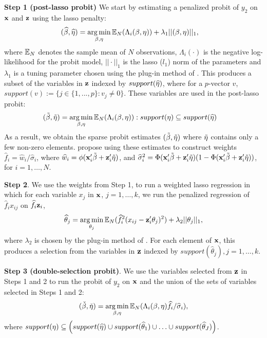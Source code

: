 \documentclass[11pt]{article}
\begin{document}
	\begin{description}
	\item{\bf Step 1 (post-lasso probit)} We start by estimating a penalized probit of $y_2$ on $\mathbf{x}$ and $\mathbf{z}$ using the lasso penalty:
	\begin{align*}
		(\widehat{\mathbf{\beta}}, \widehat{\mathbf{\eta}}) &= 
		\operatorname*{arg\,min}_{\mathbf{\beta}, \mathbf{\eta}} 
		\mathbb{E}_N(\Lambda_i(\mathbf{\beta}, \mathbf{\eta})) + \lambda_1 ||(\mathbf{\beta},
		\mathbf{\eta})||_1, 
	\end{align*}
	where $\mathbb{E}_N$ denotes the sample mean of $N$ observations, $\Lambda_i(\cdot)$ is the negative log-likelihood for the probit
	model, $||\cdot||_1 $ is the lasso ($l_1$) norm of the parameters and $\lambda_1$ is a tuning parameter chosen using the plug-in method of 
	\cite{drukker/liu:22}. This produces a subset of the variables in $\mathbf{z}$ indexed by $support(\widehat{\mathbf{\eta}})$, where for a $p$-vector $v$, $support(v):=\{ j \in \{1, ..., p\}: v_j \ne 0\}$. These variables are used in the post-lasso probit:
	\begin{align*}
		(\tilde{\mathbf{\beta}}, \tilde{\mathbf{\eta}}) &= 
		\operatorname*{arg\,min}_{\mathbf{\beta}, \mathbf{\eta}} 
		\mathbb{E}_N(\Lambda_i(\mathbf{\beta}, \mathbf{\eta})): support(\mathbf{\eta}) \subseteq
		support(\widehat{\mathbf{\eta}}) 
	\end{align*}
    As a result, we obtain the sparse probit estimates $(\tilde{\mathbf{\beta}}, \tilde{\mathbf{\eta}})$ where $\tilde{\mathbf{\eta}}$ contains only a few non-zero elements. \cite{bellonichernozhukovwei2016} propose using these estimates to construct weights
	$\hat{f}_i = \hat{w}_i/\hat{\sigma}_i$, where $\widehat{w}_i =
	\phi(\mathbf{x}_i'\tilde{\mathbf{\beta}} + \mathbf{z}_i'\tilde{\mathbf{\eta}})$, and 
	$\widehat{\sigma}_i^2 = \Phi(\mathbf{x}_i'\tilde{\mathbf{\beta}} + \mathbf{z}_i'\tilde{\mathbf{\eta}})
	(1 - \Phi(\mathbf{x}_i'\tilde{\mathbf{\beta}} + \mathbf{z}_i'\tilde{\mathbf{\eta}}))$, for $i=1,\ldots, N$.

	\item{\bf Step 2}. We use the weights from Step 1, to run a weighted lasso regression in which for each variable $x_j$ in $\mathbf{x}$, $j=1, \ldots, k$, we run the penalized regression of $\hat{f}_i x_{ij}$ on $\widehat{f}_i \mathbf{z}_i$,
	\begin{align*}
	\widehat{\theta}_j = \operatorname*{arg\,min}_{\theta_j} 
	\mathbb{E}_N (\widehat{f}_i^2(x_{ij} - \mathbf{z}_i'\theta_j)^2) 
	+ \lambda_2||\theta_j||_1,
	\end{align*}
	where $\lambda_2$ is chosen by the plug-in method of \cite{drukker/liu:22}. For each element of $\mathbf{x}$, this produces a selection from the variables in $\mathbf{z}$ indexed by $support({\hat{\theta}}_j), j=1, \ldots, k$.   

	\item{\bf Step 3 (double-selection probit)}. We use the variables selected from $\mathbf{z}$ in Steps 1 and 2 to run the probit of $y_2$ on $\mathbf{x}$ and the union of the sets of variables selected in Steps 1 and 2:
	\begin{align*}
	(\check{\mathbf{\beta}}, \check{\eta}) 
	= \operatorname*{arg\,min}_{\beta, \eta} \mathbb{E}_N (\Lambda_i(\mathbf{\beta}, \eta)\widehat{f}_i/\widehat{\sigma}_i), 
	\end{align*}
	where $support(\eta) \subseteq 
	\left(support({\widehat{\mathbf{\eta}}})
	\cup support({\widehat{\theta}}_1) 
	 \cup \ldots \cup support(\widehat{\theta}_J)\right)$.
	\end{description}
\end{document}
